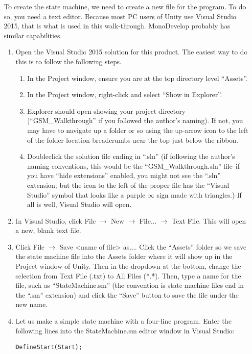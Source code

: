 \documentclass[letter,12pt]{article}
\begin{document}
To create the state machine, we need to create a new file for the program.  To do so, you need a text editor.  Because most PC users of Unity use Visual Studio 2015, that is what is used in this walk-through.  MonoDevelop probably has similar 
capabilities.

\begin{enumerate}
\item Open the Visual Studio 2015 solution for this product.  The easiest way to do this is to follow the following steps.
	\begin{enumerate}
	\item In the Project window, ensure you are at the top directory level  “Assets”.
	\item In the Project window, right-click and select “Show in Explorer”.
	\item Explorer should open showing your project directory (“GSM\_Walkthrough” if you followed the author’s naming).  If not, you may have to navigate up a folder or so using the up-arrow icon to the left of the folder location breadcrumbs near the top just below the ribbon.
	\item Doubleclick the solution file ending in “.sln” (if following the author’s naming conventions, this would be the “GSM\_Walkthrough.sln” file--if you have “hide extensions” enabled, you might not see the “.sln” extension; but the icon to the left of the proper file has the “Visual Studio” symbol that looks like a purple $\infty$ sign made with triangles.)  If all is well, Visual Studio will open.
	\end{enumerate}
\item In Visual Studio, click File $\rightarrow$ New $\rightarrow$ File... $\rightarrow$ Text File.  This will open a new, blank text file.
\item Click File $\rightarrow$ Save <name of file> as....  Click the “Assets” folder so we save the state machine file into the Assets folder where it will show up in the Project window of Unity.  Then in the dropdown at the bottom, change the selection from Text File (.txt) to All Files (*.*).  Then, type a name for the file, such as “StateMachine.sm” (the convention is state machine files end in the “.sm” extension) and click the “Save” button to save the file under the new name.
\item Let us make a simple state machine with a four-line program.  Enter the following lines into the StateMachine.sm editor window in Visual Studio:

\begin{verbatim}
DefineStart(Start);


\end{verbatim}
\end{enumerate}
\end{document}
